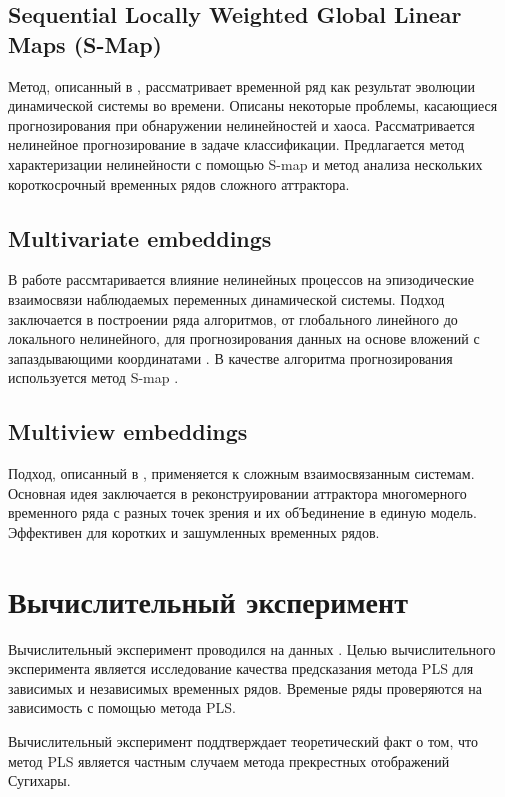 \documentclass[12pt]{extarticle}
\begin{document}
\subsection{Sequential Locally Weighted Global Linear Maps (S-Map)}
Метод, описанный в \cite{sugihara1994nonlinear}, рассматривает временной ряд как результат эволюции динамической системы во времени. Описаны некоторые проблемы, касающиеся прогнозирования при обнаружении нелинейностей и хаоса. Рассматривается нелинейное прогнозирование в задаче классификации. Предлагается метод характеризации нелинейности с помощью S-map и метод анализа нескольких короткосрочный временных рядов сложного аттрактора.

\subsection{Multivariate embeddings}
В работе \cite{dixon1999episodic} рассмтаривается влияние нелинейных процессов на эпизодические взаимосвязи наблюдаемых переменных динамической системы. Подход заключается в построении ряда алгоритмов, от глобального линейного до локального нелинейного, для прогнозирования данных на основе вложений с запаздывающими координатами \cite{rand2006dynamical}. В качестве алгоритма прогнозирования используется метод S-map \cite{sugihara1994nonlinear}.

\subsection{Multiview embeddings}
Подход, описанный в \cite{ye2016information}, применяется к сложным взаимосвязанным системам. Основная идея заключается в реконструировании аттрактора многомерного временного ряда с разных точек зрения и их обЪединение в единую модель. Эффективен для коротких и зашумленных временных рядов.



\section{Вычислительный эксперимент}
Вычислительный эксперимент проводился на данных \cite{data}.
Целью вычислительного эксперимента является исследование качества предсказания метода PLS для зависимых и независимых временных рядов. Временые ряды проверяются на зависимость с помощью метода PLS. 

Вычислительный эксперимент поддтверждает теоретический факт о том, что метод PLS является частным случаем метода прекрестных отображений Сугихары.
\end{document}

